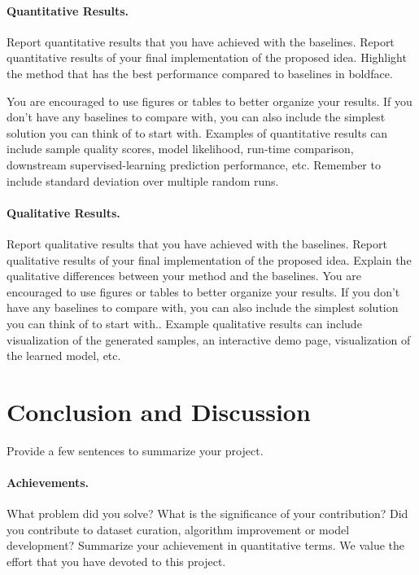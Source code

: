 \documentclass{article}
\begin{document}
\paragraph{Quantitative Results.}
Report quantitative results that you have achieved with the baselines.
Report quantitative results of your final implementation of the
proposed idea. Highlight the method that has the best performance
compared to baselines in boldface.

You are encouraged to use figures or tables to better organize your
results. If you don't have any baselines to compare with, you can
also include the simplest solution you can think of to start with.
Examples of quantitative results can include sample quality scores,
model likelihood, run-time comparison, downstream
supervised-learning prediction performance, etc. Remember to include
standard deviation over multiple random runs.

\paragraph{Qualitative Results.}
Report qualitative results that you have achieved with the baselines.
Report qualitative results of your final implementation of the
proposed idea. Explain the qualitative differences between your
method and the baselines.
You are encouraged to use figures or tables to better organize your
results. If you don't have any baselines to compare with, you can
also include the simplest solution you can think of to start with..
Example qualitative results can include visualization of the
generated samples, an interactive demo page, visualization of the
learned model, etc.


\section{Conclusion and Discussion}
Provide a few sentences to summarize your project.
\paragraph{Achievements.}
What problem did you solve? What is the significance of your
contribution? Did you contribute to dataset curation, algorithm
improvement or model development?  Summarize your achievement in
quantitative terms. We value the effort that you have devoted to this project.
\end{document}
